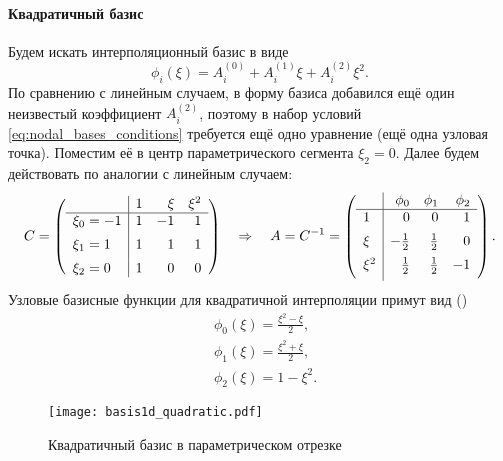 \paragraph{Квадратичный базис}
Будем искать интерполяционный базис в виде
$$
\phi_i(\xi) = A_i^{(0)} + A_i^{(1)} \xi + A_i^{(2)} \xi^2.
$$
По сравнению с линейным случаем, в форму базиса добавился ещё один неизвестый коэффициент $A_i^{(2)}$,
поэтому в набор условий \cref{eq:nodal_bases_conditions} требуется ещё одно уравнение (ещё одна узловая точка).
Поместим её в центр параметрического сегмента $\xi_2 = 0$. Далее будем действовать по
аналогии с линейным случаем:
$$
C = \left(
\begin{array}{l|rrr}
         & 1 & \xi   & \xi^2 \\ 
\hline
\xi_0=-1 & 1 & -1 & 1\\[5pt]
\xi_1= 1 & 1 &  1 & 1\\[5pt]
\xi_2= 0 & 1 &  0 & 0
\end{array}
\right)
\quad\Rightarrow\quad
A = C^{-1} = \left(
\begin{array}{l|rrr}
       & \phi_0   & \phi_1   & \phi_2 \\
\hline
 1     & 0        &  0       &  1     \\[5pt]
 \xi   & -\frac12 &  \frac12 &  0     \\[5pt]
 \xi^2 &  \frac12 &  \frac12 & -1     \\[5pt]
\end{array}
\right).
$$
Узловые базисные функции для квадратичной интерполяции примут вид ()
\begin{equation}
\label{eq:segment_quadratic_basis}
\begin{aligned}
&\phi_0(\xi) = \frac{\xi^2 - \xi}{2}, \\
&\phi_1(\xi) = \frac{\xi^2 + \xi}{2}, \\
&\phi_2(\xi) = 1 - \xi^2.
\end{aligned}
\end{equation}

\begin{figure}[h!]
\centering
\texttt{[image: basis1d\_quadratic.pdf]}
\caption{Квадратичный базис в параметрическом отрезке}
\label{fig:basis1d_quadratic}
\end{figure}

